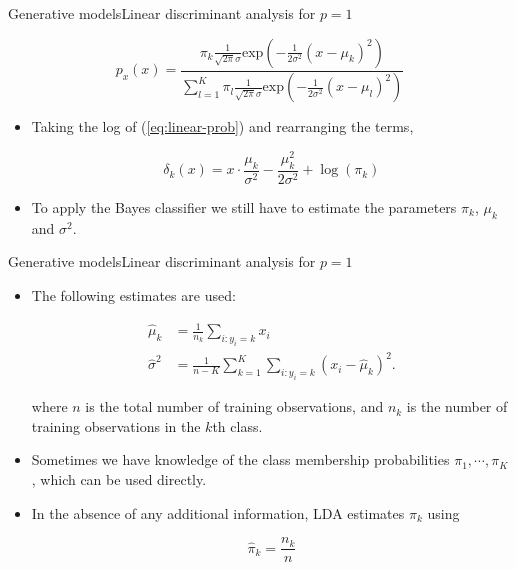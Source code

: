 \begin{frame}{Generative models}{Linear discriminant analysis for $p=1$}

    \begin{equation*}
        p_x(x) = \frac{\pi_k \frac{1}{\sqrt{2\pi} \sigma}   \text{exp} \left(  - \frac{1}{2\sigma^2} (x - \mu_k)^2    \right)  }{  \sum_{l=1}^K  \pi_l \frac{1}{\sqrt{2\pi} \sigma}   \text{exp} \left(  - \frac{1}{2\sigma^2} (x - \mu_l)^2    \right)       }
    \end{equation*}

\begin{itemize}

    \item Taking the log of (\ref{eq:linear-prob}) and rearranging the terms, \pause

    
    \begin{equation} \label{eq:delta-linear}
        \delta_k(x) = x \cdot \frac{\mu_k}{\sigma^2} - \frac{\mu_k^2}{2 \sigma^2} + \log{(\pi_k)}
    \end{equation} \pause

        \item To apply the Bayes classifier we still have to estimate the parameters $\pi_k$, $\mu_k$ and $\sigma^2$.  

\end{itemize}
    
\end{frame}


\begin{frame}{Generative models}{Linear discriminant analysis for $p=1$}

\begin{itemize}

    \item The following estimates are used: \pause

    \begin{align}
        \hat{\mu}_k &= \frac{1}{n_k} \sum_{i:y_i = k} x_i \\
        \hat{\sigma}^2 &= \frac{1}{n-K} \sum_{k=1}^K \sum_{i:y_i = k} (x_i - \hat{\mu}_k)^2.
    \end{align} \pause

    where $n$ is the total number of training observations, and $n_k$ is the number of training observations in the $k$th class. \pause

\item Sometimes we have knowledge of the class membership probabilities $\pi_1, \cdots, \pi_K $, which can be used directly. \pause

\item In the absence of any additional
information, LDA estimates $\pi_k$ using \pause

\begin{equation}
    \hat{\pi}_k = \frac{n_k}{n}
\end{equation}

\end{itemize}
    
\end{frame}

